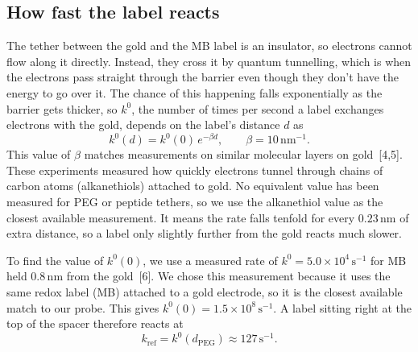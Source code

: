 \documentclass[10pt,a4paper]{article}
\numberwithin{equation}{section}
\newcommand{\cit}[1]{[#1]}
\newcommand{\nm}{\,\mathrm{nm}}
\newcommand{\dpeg}{d_{\mathrm{PEG}}}
\newcommand{\kref}{k_{\mathrm{ref}}}
\begin{document}
\subsection*{How fast the label reacts}
The tether between the gold and the MB label is an insulator, so electrons cannot flow along it directly. Instead, they cross it by quantum tunnelling, which is when the electrons pass straight through the barrier even though they don't have the energy to go over it. The chance of this happening falls exponentially as the barrier gets thicker, so $k^0$, the number of times per second a label exchanges electrons with the gold, depends on the label's distance $d$ as
\[
k^0(d) = k^0(0)\,e^{-\beta d}, \qquad \beta = 10\,\mathrm{nm^{-1}}.
\]
This value of $\beta$ matches measurements on similar molecular layers on gold~\cit{4,5}. These experiments measured how quickly electrons tunnel through chains of carbon atoms (alkanethiols) attached to gold. No equivalent value has been measured for PEG or peptide tethers, so we use the alkanethiol value as the closest available measurement. It means the rate falls tenfold for every $0.23\nm$ of extra distance, so a label only slightly further from the gold reacts much slower.

To find the value of $k^0(0)$, we use a measured rate of $k^0 = 5.0\times10^4\,\mathrm{s^{-1}}$ for MB held $0.8\nm$ from the gold~\cit{6}. We chose this measurement because it uses the same redox label (MB) attached to a gold electrode, so it is the closest available match to our probe. This gives $k^0(0) = 1.5\times10^8\,\mathrm{s^{-1}}$. A label sitting right at the top of the spacer therefore reacts at
\[
\kref = k^0(\dpeg) \approx 127\,\mathrm{s^{-1}}.
\]
\end{document}
